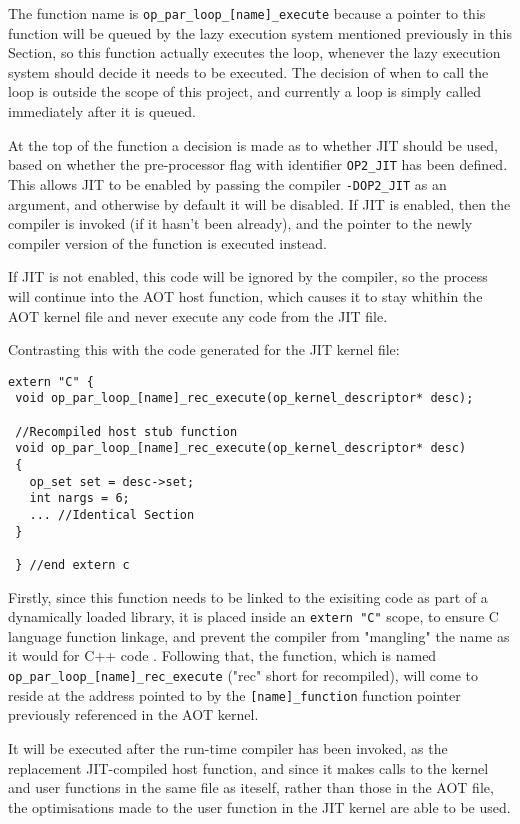 The function name is \verb|op_par_loop_[name]_execute| because a pointer to this function will be queued by the lazy execution system mentioned previously in this Section, so this function actually executes the loop, whenever the lazy execution system should decide it needs to be executed. The decision of when to call the loop is outside the scope of this project, and currently a loop is simply called immediately after it is queued.
\par At the top of the function a decision is made as to whether JIT should be used, based on whether the pre-processor flag with identifier \verb|OP2_JIT| has been defined. This allows JIT to be enabled by passing the compiler \verb|-DOP2_JIT| as an argument, and otherwise by default it will be disabled. If JIT is enabled, then the compiler is invoked (if it hasn't been already), and the pointer to the newly compiler version of the function is executed instead.
\par
If JIT is not enabled, this code will be ignored by the compiler, so the process will continue into the AOT host function, which causes it to stay whithin the AOT kernel file and never execute any code from the JIT file.

Contrasting this with the code generated for the JIT kernel file:

\begin{lstlisting}[linewidth = \textwidth, framesep=0pt, linebackgroundcolor={\ifnum\value{lstnumber}<10 \ifnum\value{lstnumber}>6 \color{red!20} \else \color{green!20} \fi \else \color{green!20} \fi}]
 extern "C" {
 void op_par_loop_[name]_rec_execute(op_kernel_descriptor* desc);

 //Recompiled host stub function
 void op_par_loop_[name]_rec_execute(op_kernel_descriptor* desc)
 {
   op_set set = desc->set;
   int nargs = 6;
   ... //Identical Section
 }

 } //end extern c
\end{lstlisting}


Firstly, since this function needs to be linked to the exisiting code as part of a dynamically loaded library, it is placed inside an \verb|extern "C"| scope, to ensure C language function linkage, and prevent the compiler from "mangling" the name as it would for C++ code \cite{linkage}. Following that, the function, which is named\\
\verb|op_par_loop_[name]_rec_execute| ("rec" short for recompiled), will come to reside at the address pointed to by the \verb|[name]_function| function pointer previously referenced in the AOT kernel.
\par
It will be executed after the run-time compiler has been invoked, as the replacement JIT-compiled host function, and since it makes calls to the kernel and user functions in the same file as iteself, rather than those in the AOT file, the optimisations made to the user function in the JIT kernel are able to be used.

